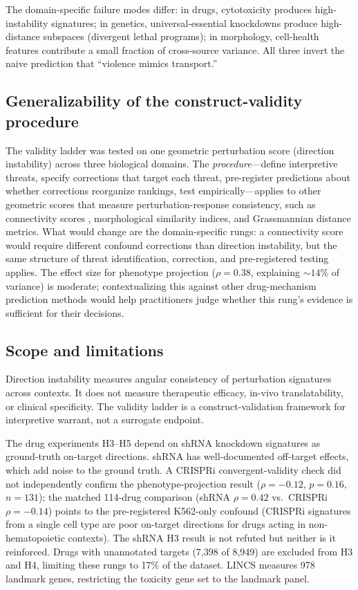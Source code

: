 \documentclass[11pt]{article}
\begin{document}
The domain-specific failure modes differ: in drugs, cytotoxicity
produces high-instability signatures; in genetics, universal-essential
knockdowns produce high-distance subspaces (divergent lethal programs);
in morphology, cell-health features contribute a small fraction of
cross-source variance. All three invert the naive prediction that
``violence mimics transport.''

\subsection{Generalizability of the construct-validity procedure}

The validity ladder was tested on one geometric perturbation score
(direction instability) across three biological domains. The
\emph{procedure}---define interpretive threats, specify corrections
that target each threat, pre-register predictions about whether
corrections reorganize rankings, test empirically---applies to other
geometric scores that measure perturbation-response consistency, such as
connectivity scores \citep{subramanian2017next}, morphological similarity
indices, and Grassmannian distance metrics. What would change are the
domain-specific rungs: a connectivity score would require different
confound corrections than direction instability, but the same
structure of threat identification, correction, and pre-registered
testing applies. The effect size for phenotype projection ($\rho = 0.38$,
explaining ${\sim}14\%$ of variance) is moderate; contextualizing this
against other drug-mechanism prediction methods would help
practitioners judge whether this rung's evidence is sufficient for
their decisions.

\subsection{Scope and limitations}

Direction instability measures angular consistency of perturbation signatures
across contexts. It does not measure therapeutic efficacy, in-vivo
translatability, or clinical specificity. The validity ladder is a
construct-validation framework for interpretive warrant, not a surrogate
endpoint.

The drug experiments H3--H5 depend on shRNA knockdown signatures as
ground-truth on-target directions. shRNA has well-documented off-target
effects, which add noise to the ground truth. A CRISPRi
convergent-validity check did not
independently confirm the phenotype-projection result ($\rho = -0.12$,
$p = 0.16$, $n = 131$); the matched 114-drug comparison (shRNA
$\rho = 0.42$ vs.\ CRISPRi $\rho = -0.14$) points to the
pre-registered K562-only confound (CRISPRi signatures from a single
cell type are poor on-target directions for drugs acting in
non-hematopoietic contexts). The shRNA H3 result is not refuted but
neither is it reinforced. Drugs with unannotated targets
(7{,}398 of 8{,}949) are excluded from H3 and H4, limiting these rungs
to 17\% of the dataset. LINCS measures 978 landmark genes, restricting
the toxicity gene set to the landmark panel.
\end{document}
